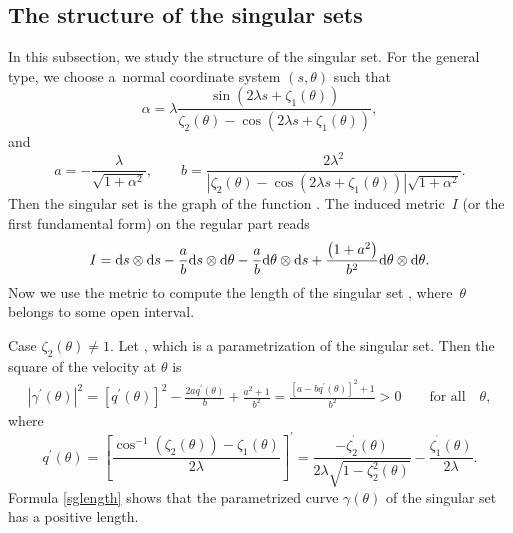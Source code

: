 \documentclass[pdftex]{sigma}
\numberwithin{equation}{section}
\begin{document}
\subsection{The structure of the singular sets} In this subsection, we study the structure of the singular set. For the general type, we choose a~normal coordinate system $(s,\theta )$
such that
\begin{equation*}%
\alpha =\lambda \frac{\sin \left( 2\lambda s+\zeta _{1}(\theta )\right) }{\zeta _{2}(\theta )-\cos \left( 2\lambda s+\zeta _{1}(\theta )\right) },
\end{equation*}
and
\begin{equation*}
a=-\frac{\lambda }{\sqrt{1+\alpha ^{2}}},\qquad b=\frac{2\lambda ^{2}}{\left \vert \zeta _{2}( \theta ) -\cos \left( 2\lambda s+\zeta
_{1}( \theta ) \right) \right \vert \sqrt{1+\alpha ^{2}}}.
\end{equation*}
Then the singular set is the graph of the function
.
The induced metric~$I$ (or the first fundamental form) on the regular part
reads
\begin{equation*}
I={\rm d}s\otimes {\rm d}s-\frac{a}{b}{\rm d}s\otimes {\rm d}\theta -\frac{a}{b}{\rm d}\theta \otimes {\rm d}s+
\frac{\bigl( 1+a^{2}\bigr) }{b^{2}}{\rm d}\theta \otimes {\rm d}\theta .
\end{equation*}
Now we use the metric to compute the length of the singular set , where~$\theta $ belongs to some
open interval.

Case $\zeta _{2}(\theta ) \neq 1$. Let , which is a parametrization
of the singular set. Then the square of the velocity at $\theta $ is
\begin{align}
\left \vert \gamma ^{\prime }(\theta )\right \vert ^{2} =\left[ q^{\prime
}( \theta ) \right] ^{2}-\frac{2aq^{\prime }( \theta )
}{b}+\frac{a^{2}+1}{b^{2}} =\frac{\left[ a-bq^{\prime }( \theta ) \right] ^{2}+1}{b^{2}}>0
\qquad\text{for all}\quad\theta , \label{sglength}
\end{align}
where
\begin{equation*}
q^{\prime }( \theta ) = \left[ \frac{\cos ^{-1}( \zeta
_{2}(\theta )) -\zeta _{1}(\theta )}{2\lambda }\right] ^{\prime }
= \frac{-\zeta _{2}^{^{\prime }}( \theta ) }{2\lambda \sqrt{
1-\zeta _{2}^{2}( \theta ) }}-\frac{\zeta _{1}^{^{\prime }}(
\theta ) }{2\lambda }.
\end{equation*}
Formula \eqref{sglength} shows that the parametrized curve $\gamma (\theta )$
of the singular set has a positive length.
\end{document}
